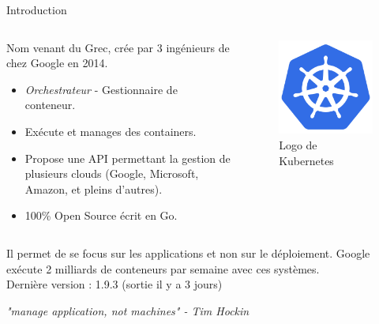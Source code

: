 \documentclass{bredelebeamer}
\begin{document}
\begin{frame}{Introduction}
\begin{columns}
\begin{column}{0.5\textwidth}

Nom venant du Grec, crée par 3 ingénieurs de chez Google en 2014.
\begin{itemize}
\item \textit{Orchestrateur} - Gestionnaire de conteneur.
\item Exécute et manages des containers.
\item Propose une API permettant la gestion de plusieurs clouds (Google, Microsoft, Amazon, et pleins d'autres).
\item 100\% Open Source écrit en Go.
\end{itemize}


\end{column}
\begin{column}{0.5\textwidth}


\begin{figure}
\centering
\includegraphics[scale=0.15]{images/img1.png}
\caption{Logo de Kubernetes}
\end{figure}

\end{column}
\end{columns}

\vspace{10px}
Il permet de se focus sur les applications et non sur le déploiement.  
Google exécute 2 milliards de conteneurs par semaine avec ces systèmes.\\
\vspace{10px}
Dernière version : 1.9.3 (sortie il y a 3 jours) \\ 

\vspace{10px}
\begin{center}
\textit{"manage application, not machines" - Tim Hockin}
\end{center}

\end{frame}
\end{document}
